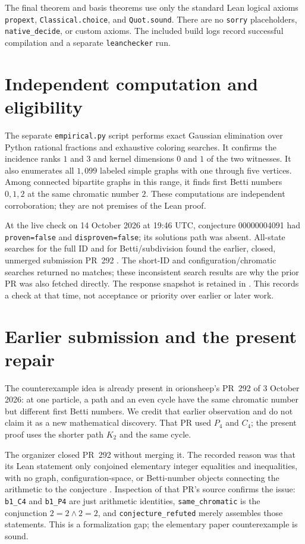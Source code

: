\documentclass[11pt]{article}
\begin{document}
The final theorem and basis theorems use only the standard Lean logical
axioms \texttt{propext}, \texttt{Classical.choice}, and \texttt{Quot.sound}.
There are no \texttt{sorry} placeholders, \texttt{native\_decide}, or custom
axioms. The included build logs record successful compilation and a separate
\texttt{leanchecker} run.

\section{Independent computation and eligibility}
The separate \texttt{empirical.py} script performs exact Gaussian elimination
over Python rational fractions and exhaustive coloring searches. It confirms
the incidence ranks $1$ and $3$ and kernel dimensions $0$ and $1$ of the two
witnesses. It also enumerates all $1{,}099$ labeled simple graphs with one
through five vertices. Among connected bipartite graphs in this range,
it finds first Betti numbers $0,1,2$ at the same chromatic number $2$.
These computations are independent corroboration; they are not premises
of the Lean proof.

At the live check on 14 October 2026 at 19:46 UTC, conjecture 00000004091
had \texttt{proven=false} and \texttt{disproven=false}; its solutions path
was absent. All-state searches for the full ID and for Betti/subdivision
found the earlier, closed, unmerged submission PR~292 \cite{prior}.
The short-ID and configuration/chromatic searches returned no matches;
these inconsistent search results are why the prior PR was also fetched
directly. The response snapshot is retained in
. This records a check at that
time, not acceptance or priority over earlier or later work.

\section{Earlier submission and the present repair}
The counterexample idea is already present in orionsheep's PR~292 of
3 October 2026: at one particle, a path and an even cycle have the same
chromatic number but different first Betti numbers. We credit that earlier
observation and do not claim it as a new mathematical discovery.
That PR used $P_4$ and $C_4$; the present proof uses the shorter path $K_2$
and the same cycle.

The organizer closed PR~292 without merging it. The recorded reason was
that its Lean statement only conjoined elementary integer equalities and
inequalities, with no graph, configuration-space, or Betti-number
objects connecting the arithmetic to the conjecture \cite{prior-review}.
Inspection of that PR's source confirms the issue:
\texttt{b1\_C4} and \texttt{b1\_P4} are just arithmetic identities,
\texttt{same\_chromatic} is the conjunction $2=2\wedge2=2$, and
\texttt{conjecture\_refuted} merely assembles those statements.
This is a formalization gap; the elementary paper counterexample is sound.
\end{document}

